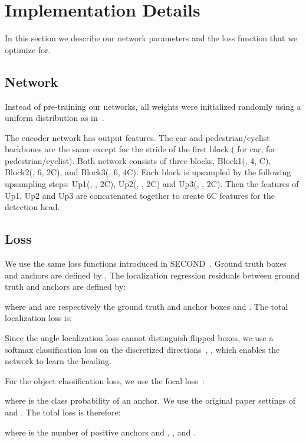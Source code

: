 \documentclass[10pt,twocolumn,letterpaper]{article}
\newcommand{\squeeze}{\vspace{-0.5mm}}
\begin{document}
 


\section{Implementation Details} \label{sec:training}
\squeeze
In this section we describe our network parameters and the loss function that we optimize for.

\subsection{Network}
\squeeze
Instead of pre-training our networks, all weights were initialized randomly using a uniform distribution as in~\cite{heInit}. 

The encoder network has  output features.
The car and pedestrian/cyclist backbones are the same except for the stride of the first block ( for car,  for pedestrian/cyclist).
Both network consists of three blocks, Block1(, 4, C), Block2(, 6, 2C), and Block3(, 6, 4C).
Each block is upsampled by the following upsampling steps: Up1(, , 2C), Up2(, , 2C) and Up3(, , 2C).
Then the features of Up1, Up2 and Up3 are concatenated together to create 6C features for the detection head.



\subsection{Loss}
\squeeze
We use the same loss functions introduced in SECOND~\cite{second}.
Ground truth boxes and anchors are defined by .
The localization regression residuals between ground truth and anchors are defined by:

where  and  are respectively the ground truth and anchor boxes and .
The total localization loss is:


Since the angle localization loss cannot distinguish flipped boxes, we use a softmax classification loss on the discretized directions~\cite{second}, , which enables the network to learn the heading.

For the object classification loss, we use the focal loss~\cite{retinanet}:


\squeeze
where  is the class probability of an anchor.
We use the original paper settings of  and .
The total loss is therefore: 
\squeeze

\squeeze
where  is the number of positive anchors and , , and .
\end{document}
